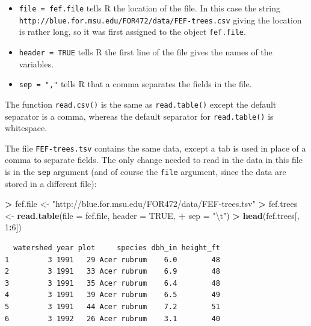 \documentclass[]{krantz}
\makeatletter
\newenvironment{Shaded}{\begin{snugshade}}{\end{snugshade}}
\newcommand{\CharTok}[1]{\textcolor[rgb]{0.5,0.5,0.5}{#1}}
\newcommand{\DataTypeTok}[1]{\textcolor[rgb]{0.27,0.27,0.27}{#1}}
\newcommand{\DecValTok}[1]{\textcolor[rgb]{0.06,0.06,0.06}{#1}}
\newcommand{\KeywordTok}[1]{\textcolor[rgb]{0.27,0.27,0.27}{\textbf{#1}}}
\newcommand{\NormalTok}[1]{#1}
\newcommand{\OperatorTok}[1]{\textcolor[rgb]{0.43,0.43,0.43}{\textbf{#1}}}
\newcommand{\OtherTok}[1]{\textcolor[rgb]{0.37,0.37,0.37}{#1}}
\newcommand{\StringTok}[1]{\textcolor[rgb]{0.5,0.5,0.5}{#1}}
\providecommand{\tightlist}{%
  \setlength{\itemsep}{0pt}\setlength{\parskip}{0pt}}
\newenvironment{kframe}{%
\medskip{}
\setlength{\fboxsep}{.8em}
 \def\at@end@of@kframe{}%
 \ifinner\ifhmode%
  \def\at@end@of@kframe{\end{minipage}}%
  \begin{minipage}{\columnwidth}%
 \fi\fi%
 \def\FrameCommand##1{\hskip\@totalleftmargin \hskip-\fboxsep
 \colorbox{shadecolor}{##1}\hskip-\fboxsep
     \hskip-\linewidth \hskip-\@totalleftmargin \hskip\columnwidth}%
 \MakeFramed {\advance\hsize-\width
   \@totalleftmargin\z@ \linewidth\hsize
   \@setminipage}}%
 {\par\unskip\endMakeFramed%
 \at@end@of@kframe}
\renewenvironment{Shaded}{\begin{kframe}}{\end{kframe}}
\makeatother
\begin{document}
\begin{itemize}
\tightlist
\item
  \texttt{file\ =\ fef.file} tells R the location of the file. In this case the string \texttt{http://blue.for.msu.edu/FOR472/data/FEF-trees.csv} giving the location is rather long, so it was first assigned to the object \texttt{fef.file}.
\item
  \texttt{header\ =\ TRUE} tells R the first line of the file gives the names of the variables.
\item
  \texttt{sep\ =\ ","} tells R that a comma separates the fields in the file.
\end{itemize}

The function \texttt{read.csv()} is the same as \texttt{read.table()} except the default separator is a comma, whereas the default separator for \texttt{read.table()} is whitespace.

The file \texttt{FEF-trees.tsv} contains the same data, except a tab is used in place of a comma to separate fields. The only change needed to read in the data in this file is in the \texttt{sep} argument (and of course the \texttt{file} argument, since the data are stored in a different file):

\begin{Shaded}
\begin{Highlighting}[]
\OperatorTok{>}\StringTok{ }\NormalTok{fef.file <-}\StringTok{ "http://blue.for.msu.edu/FOR472/data/FEF-trees.tsv"}
\OperatorTok{>}\StringTok{ }\NormalTok{fef.trees <-}\StringTok{ }\KeywordTok{read.table}\NormalTok{(}\DataTypeTok{file =}\NormalTok{ fef.file, }\DataTypeTok{header =} \OtherTok{TRUE}\NormalTok{, }
\OperatorTok{+}\StringTok{   }\DataTypeTok{sep =} \StringTok{"}\CharTok{\textbackslash{}t}\StringTok{"}\NormalTok{)}
\OperatorTok{>}\StringTok{ }\KeywordTok{head}\NormalTok{(fef.trees[, }\DecValTok{1}\OperatorTok{:}\DecValTok{6}\NormalTok{])}
\end{Highlighting}
\end{Shaded}

\begin{verbatim}
  watershed year plot     species dbh_in height_ft
1         3 1991   29 Acer rubrum    6.0        48
2         3 1991   33 Acer rubrum    6.9        48
3         3 1991   35 Acer rubrum    6.4        48
4         3 1991   39 Acer rubrum    6.5        49
5         3 1991   44 Acer rubrum    7.2        51
6         3 1992   26 Acer rubrum    3.1        40
\end{verbatim}
\end{document}
